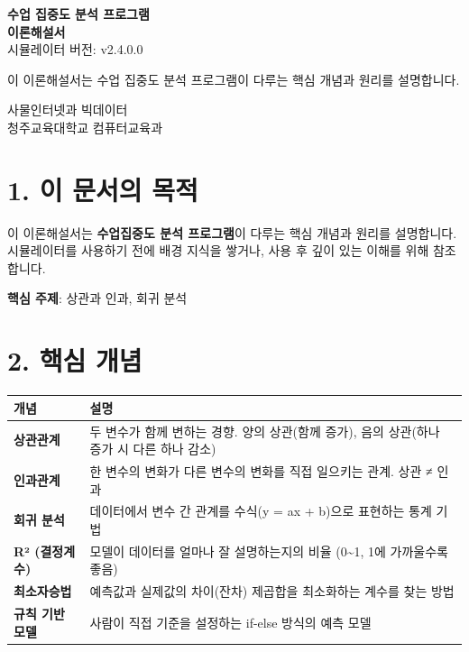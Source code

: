 \documentclass[11pt,a4paper]{article}
\begin{document}
\begin{titlepage}
\centering
\vspace*{3cm}
{\Huge\bfseries\color{primary} 수업 집중도 분석 프로그램}\\[0.5cm]
{\Huge\bfseries\color{primary} 이론해설서}
\\[1.5cm]
{\Large 시뮬레이터 버전: v2.4.0.0}
\\[2cm]
\begin{tcolorbox}[summarybox]
\centering
{\large 이 이론해설서는 수업 집중도 분석 프로그램이 다루는 핵심 개념과 원리를 설명합니다.}
\end{tcolorbox}
\vfill
{\large 사물인터넷과 빅데이터}\\[0.3cm]
{\large 청주교육대학교 컴퓨터교육과}
\vspace{1cm}
\end{titlepage}

\section*{1. 이 문서의 목적}

이 이론해설서는 \textbf{수업집중도 분석 프로그램}이 다루는 핵심 개념과 원리를 설명합니다. 시뮬레이터를 사용하기 전에 배경 지식을 쌓거나, 사용 후 깊이 있는 이해를 위해 참조합니다.


\begin{tcolorbox}[summarybox]
\textbf{핵심 주제}: 상관과 인과, 회귀 분석

\end{tcolorbox}


\section*{2. 핵심 개념}

\begin{center}
\renewcommand{\arraystretch}{1.4}
\begin{tabular}{|p{2.5cm}|p{12.5cm}|}
\hline
\rowcolor{tableheader}
\textbf{개념} & \textbf{설명} \\
\hline
\textbf{상관관계} & 두 변수가 함께 변하는 경향. 양의 상관(함께 증가), 음의 상관(하나 증가 시 다른 하나 감소) \\
\hline
\textbf{인과관계} & 한 변수의 변화가 다른 변수의 변화를 직접 일으키는 관계. 상관 ≠ 인과 \\
\hline
\textbf{회귀 분석} & 데이터에서 변수 간 관계를 수식(y = ax + b)으로 표현하는 통계 기법 \\
\hline
\textbf{R² (결정계수)} & 모델이 데이터를 얼마나 잘 설명하는지의 비율 (0\textasciitilde{}1, 1에 가까울수록 좋음) \\
\hline
\textbf{최소자승법} & 예측값과 실제값의 차이(잔차) 제곱합을 최소화하는 계수를 찾는 방법 \\
\hline
\textbf{규칙 기반 모델} & 사람이 직접 기준을 설정하는 if-else 방식의 예측 모델 \\
\hline
\end{tabular}
\end{center}
\end{document}
